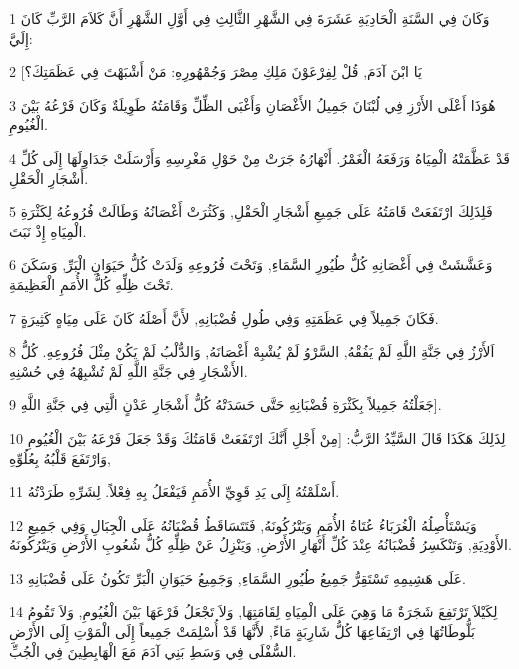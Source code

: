 \par 1 وَكَانَ فِي السَّنَةِ الْحَادِيَةِ عَشَرَةَ فِي الشَّهْرِ الثَّالِثِ فِي أَوَّلِ الشَّهْرِ أَنَّ كَلاَمَ الرَّبِّ كَانَ إِلَيَّ:
\par 2 [يَا ابْنَ آدَمَ, قُلْ لِفِرْعَوْنَ مَلِكِ مِصْرَ وَجُمْهُورِهِ: مَنْ أَشْبَهْتَ فِي عَظَمَتِكَ؟
\par 3 هُوَذَا أَعْلَى الأَرْزِ فِي لُبْنَانَ جَمِيلُ الأَغْصَانِ وَأَغْبَى الظِّلِّ وَقَامَتُهُ طَوِيلَةٌ وَكَانَ فَرْعُهُ بَيْنَ الْغُيُومِ.
\par 4 قَدْ عَظَّمَتْهُ الْمِيَاهُ وَرَفَعَهُ الْغَمْرُ. أَنْهَارُهُ جَرَتْ مِنْ حَوْلِ مَغْرِسِهِ وَأَرْسَلَتْ جَدَاوِلَهَا إِلَى كُلِّ أَشْجَارِ الْحَقْلِ.
\par 5 فَلِذَلِكَ ارْتَفَعَتْ قَامَتُهُ عَلَى جَمِيعِ أَشْجَارِ الْحَقْلِ, وَكَثُرَتْ أَغْصَانُهُ وَطَالَتْ فُرُوعُهُ لِكَثْرَةِ الْمِيَاهِ إِذْ نَبَتَ.
\par 6 وَعَشَّشَتْ فِي أَغْصَانِهِ كُلُّ طُيُورِ السَّمَاءِ, وَتَحْتَ فُرُوعِهِ وَلَدَتْ كُلُّ حَيَوَانِ الْبَرِّ, وَسَكَنَ تَحْتَ ظِلِّهِ كُلُّ الأُمَمِ الْعَظِيمَةِ.
\par 7 فَكَانَ جَمِيلاً فِي عَظَمَتِهِ وَفِي طُولِ قُضْبَانِهِ, لأَنَّ أَصْلَهُ كَانَ عَلَى مِيَاهٍ كَثِيرَةٍ.
\par 8 اَلأَرْزُ فِي جَنَّةِ اللَّهِ لَمْ يَفُقْهُ, السَّرْوُ لَمْ يُشْبِهْ أَغْصَانَهُ, وَالدُّلْبُ لَمْ يَكُنْ مِثْلَ فُرُوعِهِ. كُلُّ الأَشْجَارِ فِي جَنَّةِ اللَّهِ لَمْ تُشْبِهْهُ فِي حُسْنِهِ.
\par 9 جَعَلْتُهُ جَمِيلاً بِكَثْرَةِ قُضْبَانِهِ حَتَّى حَسَدَتْهُ كُلُّ أَشْجَارِ عَدْنٍ الَّتِي فِي جَنَّةِ اللَّهِ].
\par 10 لِذَلِكَ هَكَذَا قَالَ السَّيِّدُ الرَّبُّ: [مِنْ أَجْلِ أَنَّكَ ارْتَفَعَتْ قَامَتُكَ وَقَدْ جَعَلَ فَرْعَهُ بَيْنَ الْغُيُومِ وَارْتَفَعَ قَلْبُهُ بِعُلُوِّهِ,
\par 11 أَسْلَمْتُهُ إِلَى يَدِ قَوِيِّ الأُمَمِ فَيَفْعَلُ بِهِ فِعْلاً. لِشَرِّهِ طَرَدْتُهُ.
\par 12 وَيَسْتَأْصِلُهُ الْغُرَبَاءُ عُتَاةُ الأُمَمِ وَيَتْرُكُونَهُ, فَتَتَسَاقَطُ قُضْبَانُهُ عَلَى الْجِبَالِ وَفِي جَمِيعِ الأَوْدِيَةِ, وَتَنْكَسِرُ قُضْبَانُهُ عِنْدَ كُلِّ أَنْهَارِ الأَرْضِ, وَيَنْزِلُ عَنْ ظِلِّهِ كُلُّ شُعُوبِ الأَرْضِ وَيَتْرُكُونَهُ.
\par 13 عَلَى هَشِيمِهِ تَسْتَقِرُّ جَمِيعُ طُيُورِ السَّمَاءِ, وَجَمِيعُ حَيَوَانِ الْبَرِّ تَكُونُ عَلَى قُضْبَانِهِ.
\par 14 لِكَيْلاَ تَرْتَفِعَ شَجَرَةٌ مَا وَهِيَ عَلَى الْمِيَاهِ لِقَامَتِهَا, وَلاَ تَجْعَلُ فَرْعَهَا بَيْنَ الْغُيُومِ, وَلاَ تَقُومُ بَلُّوطَاتُهَا فِي ارْتِفَاعِهَا كُلُّ شَارِبَةٍ مَاءً, لأَنَّهَا قَدْ أُسْلِمَتْ جَمِيعاً إِلَى الْمَوْتِ إِلَى الأَرْضِ السُّفْلَى فِي وَسَطِ بَنِي آدَمَ مَعَ الْهَابِطِينَ فِي الْجُبِّ.
